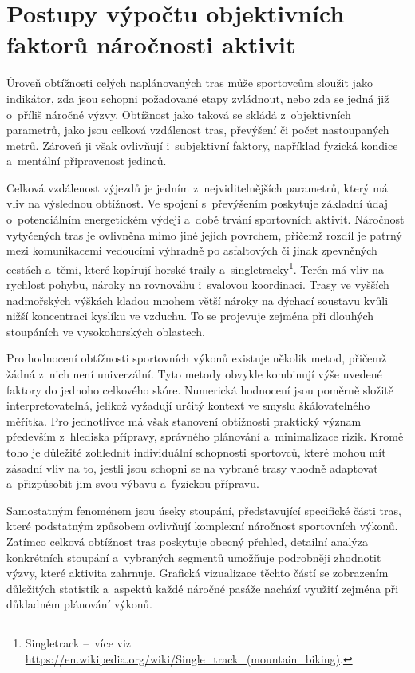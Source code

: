 \section{Postupy výpočtu objektivních faktorů náročnosti aktivit}
\label{procedures-for-calculating-objective-activity-difficulty-factors}

Úroveň obtížnosti celých naplánovaných tras může sportovcům sloužit jako indikátor, zda jsou schopni požadované etapy zvládnout, nebo zda se jedná již o~příliš náročné výzvy.
Obtížnost jako taková se skládá z~objektivních parametrů, jako jsou celková vzdálenost tras, převýšení či počet nastoupaných metrů.
Zároveň ji však ovlivňují i~subjektivní faktory, například fyzická kondice a~mentální připravenost jedinců.

Celková vzdálenost výjezdů je jedním z~nejviditelnějších parametrů, který má vliv na výslednou obtížnost.
Ve spojení s~převýšením poskytuje základní údaj o~potenciálním energetickém výdeji a~době trvání sportovních aktivit.
Náročnost vytyčených tras je ovlivněna mimo jiné jejich povrchem, přičemž rozdíl je patrný mezi komunikacemi vedoucími výhradně po asfaltových či jinak zpevněných cestách a~těmi, které kopírují horské traily a~singletracky\footnote{Singletrack --~více viz \url{https://en.wikipedia.org/wiki/Single_track_(mountain_biking)}.}.
Terén má vliv na rychlost pohybu, nároky na rovnováhu i~svalovou koordinaci.
Trasy ve vyšších nadmořských výškách kladou mnohem větší nároky na dýchací soustavu kvůli nižší koncentraci kyslíku ve vzduchu.
To se projevuje zejména při dlouhých stoupáních ve vysokohorských oblastech.

Pro hodnocení obtížnosti sportovních výkonů existuje několik metod, přičemž žádná z~nich není univerzální.
Tyto metody obvykle kombinují výše uvedené faktory do jednoho celkového skóre.
Numerická hodnocení jsou poměrně složitě interpretovatelná, jelikož vyžadují určitý kontext ve smyslu škálovatelného měřítka.
Pro jednotlivce má však stanovení obtížnosti praktický význam především z~hlediska přípravy, správného plánování a~minimalizace rizik.
Kromě toho je důležité zohlednit individuální schopnosti sportovců, které mohou mít zásadní vliv na to, jestli jsou schopni se na vybrané trasy vhodně adaptovat a~přizpůsobit jim svou výbavu a~fyzickou přípravu.

Samostatným fenoménem jsou úseky stoupání, představující specifické části tras, které podstatným způsobem ovlivňují komplexní náročnost sportovních výkonů.
Zatímco celková obtížnost tras poskytuje obecný přehled, detailní analýza konkrétních stoupání a~vybraných segmentů umožňuje podrobněji zhodnotit výzvy, které aktivita zahrnuje.
Grafická vizualizace těchto částí se zobrazením důležitých statistik a~aspektů každé náročné pasáže nachází využití zejména při důkladném plánování výkonů.

